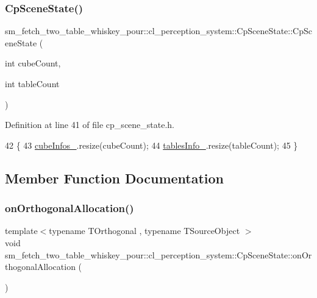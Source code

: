 \subsubsection{\texorpdfstring{Cp\+Scene\+State()}{CpSceneState()}}
{\footnotesize\ttfamily sm\+\_\+fetch\+\_\+two\+\_\+table\+\_\+whiskey\+\_\+pour\+::cl\+\_\+perception\+\_\+system\+::\+Cp\+Scene\+State\+::\+Cp\+Scene\+State (\begin{DoxyParamCaption}\item[{int}]{cube\+Count,  }\item[{int}]{table\+Count }\end{DoxyParamCaption})\hspace{0.3cm}{\ttfamily [inline]}}



Definition at line 41 of file cp\+\_\+scene\+\_\+state.\+h.


\begin{DoxyCode}
42             \{
43                 \hyperlink{classsm__fetch__two__table__whiskey__pour_1_1cl__perception__system_1_1CpSceneState_a8106a20f8f9a385835a39f6fb2960165}{cubeInfos\_}.resize(cubeCount);
44                 \hyperlink{classsm__fetch__two__table__whiskey__pour_1_1cl__perception__system_1_1CpSceneState_a5d6fd3eb480fbb9a241c44ddd42c2930}{tablesInfo\_}.resize(tableCount);
45             \}
\end{DoxyCode}


\subsection{Member Function Documentation}
\mbox{\label{classsm__fetch__two__table__whiskey__pour_1_1cl__perception__system_1_1CpSceneState_a97d0dfdd9cd3adf6a93f523963a4c0a7}} 
\subsubsection{\texorpdfstring{on\+Orthogonal\+Allocation()}{onOrthogonalAllocation()}}
{\footnotesize\ttfamily template$<$typename T\+Orthogonal , typename T\+Source\+Object $>$ \\
void sm\+\_\+fetch\+\_\+two\+\_\+table\+\_\+whiskey\+\_\+pour\+::cl\+\_\+perception\+\_\+system\+::\+Cp\+Scene\+State\+::on\+Orthogonal\+Allocation (\begin{DoxyParamCaption}{ }\end{DoxyParamCaption})\hspace{0.3cm}{\ttfamily [inline]}}



